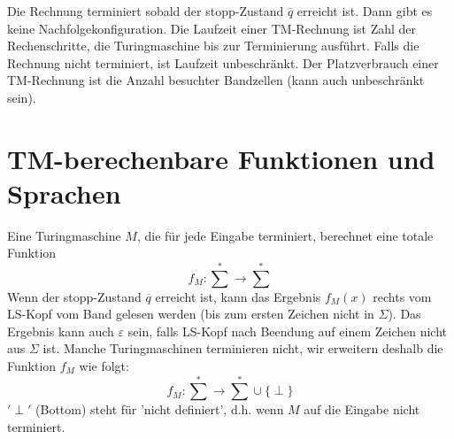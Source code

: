 \par\medskip
Die Rechnung terminiert sobald der stopp-Zustand $\overline{q}$ erreicht ist. Dann gibt es keine Nachfolgekonfiguration. Die Laufzeit einer TM-Rechnung ist Zahl der Rechenschritte, die Turingmaschine bis zur Terminierung ausführt. Falls die Rechnung nicht terminiert, ist Laufzeit unbeschränkt. Der Platzverbrauch einer TM-Rechnung ist die Anzahl besuchter Bandzellen (kann auch unbeschränkt sein).
\par\medskip

\section{TM-berechenbare Funktionen und Sprachen}

Eine Turingmaschine $M$, die für jede Eingabe terminiert, berechnet eine totale Funktion $$f_M:\sum\limits^* \rightarrow \sum\limits^*$$ Wenn der stopp-Zustand $\overline{q}$ erreicht ist, kann das Ergebnis $f_M(x)$ rechts vom LS-Kopf vom Band gelesen werden (bis zum ersten Zeichen nicht in $\Sigma$). Das Ergebnis kann auch $\varepsilon$ sein,  falls LS-Kopf nach Beendung auf einem Zeichen nicht aus $\Sigma$ ist. Manche Turingmaschinen terminieren nicht, wir erweitern deshalb die Funktion $f_M$ wie folgt: $$ f_M:\sum\limits^* \rightarrow \sum\limits^* \cup \{ \perp \} $$ $'\perp'$ (Bottom) steht für 'nicht definiert', d.h. wenn $M$ auf die Eingabe nicht terminiert.